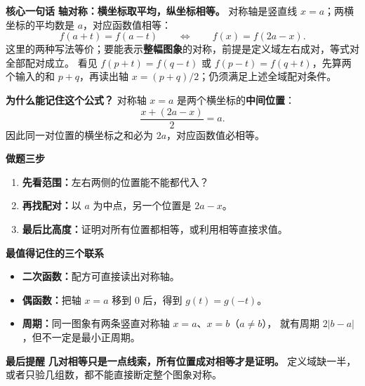 \clearpage
\begin{summarybox}
  \textbf{\textcolor{CSummary}{核心一句话}}
  \textbf{轴对称：横坐标取平均，纵坐标相等。}
  对称轴是竖直线 $x=a$；两横坐标的平均数是 $a$，对应函数值相等：
  \[
    \boxed{f(a+t)=f(a-t)}\qquad\Longleftrightarrow\qquad
    \boxed{f(x)=f(2a-x)}.
  \]
  这里的两种写法等价；要能表示\textbf{整幅图象}的对称，前提是定义域左右成对，等式对全部配对成立。
  看见 $f(p+t)=f(q-t)$ 或 $f(p-t)=f(q+t)$，先算两个输入的和 $p+q$，再读出轴 $x=(p+q)/2$；仍须满足上述全域配对条件。

  \medskip
  \textbf{\textcolor{CSummary}{为什么能记住这个公式？}}
  对称轴 $x=a$ 是两个横坐标的\textbf{中间位置}：
  \[
    \frac{x+(2a-x)}2=a.
  \]
  因此同一对位置的横坐标之和必为 $2a$，对应函数值必相等。

  \medskip
  \textbf{\textcolor{CSummary}{做题三步}}
  \begin{enumerate}[leftmargin=*,itemsep=0.35em,topsep=0.3em]
    \item \textbf{先看范围：}左右两侧的位置能不能都代入？
    \item \textbf{再找配对：}以 $a$ 为中点，另一个位置是 $2a-x$。
    \item \textbf{最后比高度：}证明对所有位置都相等，或利用相等直接求值。
  \end{enumerate}

  \medskip
  \textbf{\textcolor{CSummary}{最值得记住的三个联系}}
  \begin{itemize}[leftmargin=*,itemsep=0.35em,topsep=0.3em]
    \item \textbf{二次函数：}配方可直接读出对称轴。
    \item \textbf{偶函数：}把轴 $x=a$ 移到 $0$ 后，得到 $g(t)=g(-t)$。
    \item \textbf{周期：}同一图象有两条竖直对称轴 $x=a$、$x=b$（$a\ne b$），
      就有周期 $2|b-a|$，但不一定是最小正周期。
  \end{itemize}

  \medskip
  \textbf{\textcolor{CSummary}{最后提醒}}
  \textbf{几对相等只是一点线索，所有位置成对相等才是证明。}
  定义域缺一半，或者只验几组数，都不能直接断定整个图象对称。
\end{summarybox}

